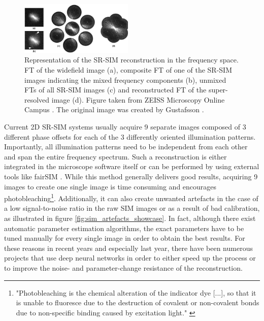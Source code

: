 \documentclass[conference]{IEEEtran}
\begin{document}
\begin{figure}[h]
    \centering
    \includegraphics[width=0.48\textwidth]{images/Inkedzeiss_sim_showcase_LI.jpg}
    \caption{Representation of the SR-SIM reconstruction in the frequency space. FT of the widefield image (a), composite FT of one of the SR-SIM images indicating the mixed frequency components (b), unmixed FTs of all SR-SIM images (c) and reconstructed FT of the super-resolved image (d). Figure taken from ZEISS Microscopy Online Campus \cite{zeiss_sim}. The original image was created by Gustafsson \cite{Gustafsson_orig}.}
    \label{fig:zeiss_sim}
\end{figure}

Current 2D SR-SIM systems usually acquire 9 separate images composed of 3 different phase offsets for each of the 3 differently oriented illumination patterns. Importantly, all illumination patterns need to be independent from each other and span the entire frequency spectrum. Such a reconstruction is either integrated in the microscope software itself or can be performed by using external tools like fairSIM \cite{fairsim_article}. While this method generally delivers good results, acquiring 9 images to create one single image is time consuming and encourages photobleaching\footnote{"Photobleaching is the chemical alteration of the indicator dye [...], so that it is unable to fluoresce due to the destruction of covalent or non-covalent bonds due to non-specific binding caused by excitation light." \cite{OMARA2018130}}. Additionally, it can also create unwanted artefacts in the case of a low signal-to-noise ratio in the raw SIM images or as a result of bad calibration, as illustrated in figure \ref{fig:sim_artefacts_showcase}. In fact, although there exist automatic parameter estimation algorithms, the exact parameters have to be tuned manually for every single image in order to obtain the best results. For these reasons in recent years and especially last year, there have been numerous projects that use deep neural networks in order to either speed up the process or to improve the noise- and parameter-change resistance of the reconstruction.
\end{document}
